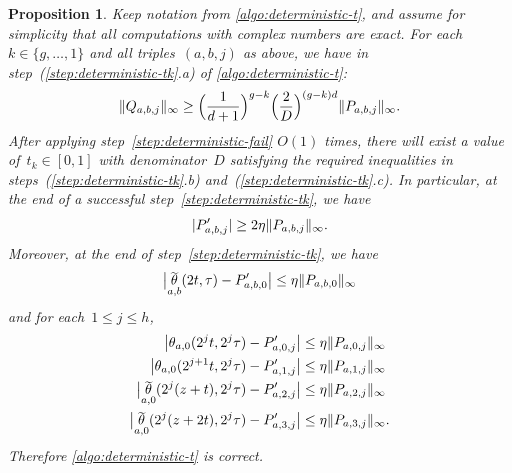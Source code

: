 \documentclass[12pt,oneside]{amsart}
\numberwithin{equation}{section}
\newtheorem{prop}[equation]{Proposition}
\theoremstyle{definition}
\DeclareMathOperator{\thetatilde}{\rlap{\raisebox{-0.1ex}{$\widetilde{\phantom{\,t}}$}}\theta}
\DeclarePairedDelimiter{\abs}{|}{|}
\DeclarePairedDelimiter{\paren}{(}{)}
\DeclarePairedDelimiter{\norm}{\|}{\|}
\begin{document}
\begin{prop}
  \label{prop:deterministic-t}
  Keep notation from \cref{algo:deterministic-t}, and assume for simplicity
  that all computations with complex numbers are exact.  For
  each~$k\in \{g,\ldots,1\}$ and all triples~$(a,b,j)$ as above, we have in
  step~(\ref{step:deterministic-tk}.a) of \cref{algo:deterministic-t}:
  \begin{displaymath}
    \norm{Q_{a,b,j}}_\infty \geq \paren[\Big]{\frac{1}{d + 1}}^{g - k} \paren[\Big]{\frac 2D}^{(g-k)d} \norm{P_{a,b,j}}_\infty.
  \end{displaymath}
  After applying step~\eqref{step:deterministic-fail} $O(1)$ times, there will
  exist a value of~$t_k\in [0,1]$ with denominator~$D$ satisfying the required
  inequalities in steps~(\ref{step:deterministic-tk}.b)
  and~(\ref{step:deterministic-tk}.c). In particular, at the end of a
  successful step~\eqref{step:deterministic-tk}, we have
  \begin{displaymath}
    \abs{P'_{a,b,j}} \geq 2\eta \norm{P_{a,b,j}}_\infty.
  \end{displaymath}
  Moreover, at the end of step~\eqref{step:deterministic-tk}, we have
  \begin{displaymath}
    \abs[\big]{\thetatilde_{a,b}(2t,\tau) - P'_{a,b,0}}
    \leq \eta \norm{P_{a,b,0}}_\infty
  \end{displaymath}
  and for each~$1\leq j\leq h$,
  \begin{align*}
    \abs[\big]{\theta_{a,0}(2^jt,2^j\tau) - P'_{a,0,j}}
    &\leq \eta \norm{P_{a,0,j}}_\infty\\
    \abs[\big]{\theta_{a,0}(2^{j+1}t,2^j\tau) - P'_{a,1,j}}
    &\leq \eta \norm{P_{a,1,j}}_\infty\\
    \abs[\big]{\thetatilde_{a,0}(2^j(z+t),2^j\tau) - P'_{a,2,j}}
    &\leq \eta \norm{P_{a,2,j}}_\infty\\
    \abs[\big]{\thetatilde_{a,0}(2^j(z+2t),2^j\tau) - P'_{a,3,j}}
    &\leq \eta \norm{P_{a,3,j}}_\infty.
  \end{align*}
  Therefore \cref{algo:deterministic-t} is correct.
\end{prop}
\end{document}
